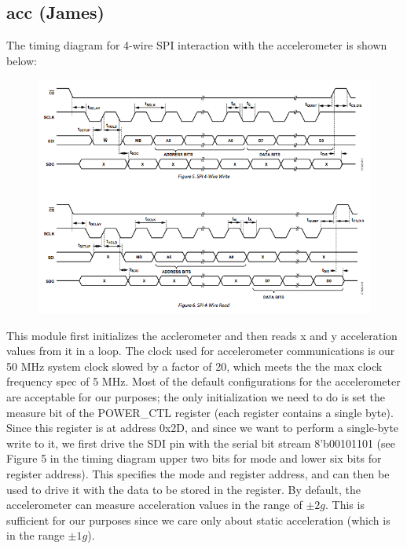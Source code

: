 \documentclass{article}
\begin{document}
\subsection{acc (James)}
The timing diagram for 4-wire SPI interaction with the accelerometer is shown below:

\begin{center}
\begin{figure}[H]
\label{fig:acc_timing}
\centering
\includegraphics[width=\textwidth]{./img/acc_timing}
\end{figure}
\end{center}

This module first initializes the acclerometer and then reads x and y acceleration values from it in a loop.
The clock used for accelerometer communications is our 50 MHz system clock slowed by a factor of 20, which meets the the max clock frequency spec of 5 MHz.
Most of the default configurations for the accelerometer are acceptable for our purposes;
the only initialization we need to do is set the measure bit of the POWER\_CTL register (each register contains a single byte).
Since this register is at address 0x2D, and since we want to perform a single-byte write to it,
we first drive the SDI pin with the serial bit stream 8'b00101101 (see Figure 5 in the timing diagram upper two bits for mode and lower six bits for register address).
This specifies the mode and register address, and can then be used to drive it with the data to be stored in the register.
By default, the accelerometer can measure acceleration values in the range of $\pm 2g$.
This is sufficient for our purposes since we care only about static acceleration (which is in the range $\pm 1g$).
\end{document}
